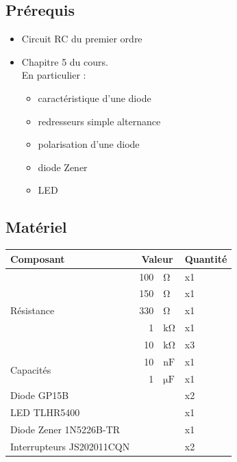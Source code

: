 \documentclass{../template/labo}
\begin{document}
\subsection{Prérequis}
\begin{itemize}
\item Circuit RC du premier ordre
\item Chapitre 5 du cours.\\ En particulier :
\begin{itemize}
\item caractéristique d'une diode
\item redresseurs simple alternance
\item polarisation d'une diode
\item diode Zener
\item LED
\end{itemize}



\end{itemize}


\subsection{Matériel}

\begin{center}
\begin{tabular}{p{}rlp{}}
	Composant & \multicolumn{2}{c}{Valeur} & Quantité \\\toprule
	\multirow{5}{*}{Résistance} & 100 & $\si{\ohm}$ & x1 \\
															& 150 & $\si{\ohm}$ & x1 \\
															& 330 & $\si{\ohm}$ & x1 \\
															& 1 & $\si{\kohm}$ & x1 \\
															& 10 & $\si{\kohm}$ & x3 \\\midrule
	\multirow{2}{*}{Capacités} 	& 10 & $\si{\nano\farad}$ & x1 \\
															& 1 & $\si{\micro\farad}$ & x1 \\\midrule
	Diode GP15B &   &   & x2 \\\midrule
	LED TLHR5400 &   &   & x1 \\\midrule
	Diode Zener 1N5226B-TR &   &   & x1 \\\midrule
	Interrupteurs JS202011CQN &   &   & x2 \\\bottomrule
\end{tabular}
\end{center}
\end{document}
